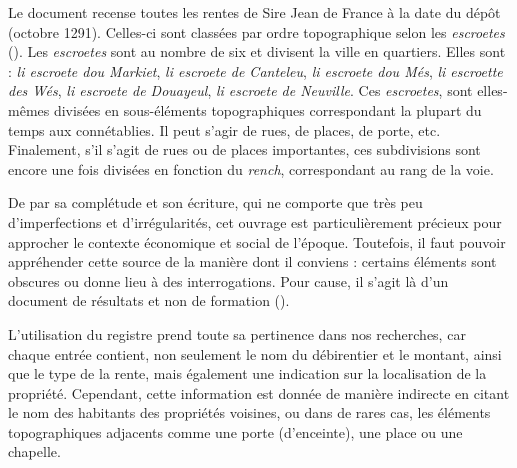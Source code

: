 Le document recense toutes les rentes de Sire Jean de France à la date du dépôt (octobre 1291). Celles-ci sont classées par ordre topographique selon les \textit{escroetes} (\cite{espinas_les_1933}). Les \textit{escroetes} sont au nombre de six et divisent la ville en quartiers. Elles sont : \textit{li escroete dou Markiet}, \textit{li escroete de Canteleu}, \textit{li escroete dou Més}, \textit{li escroette des Wés}, \textit{li escroete de Douayeul}, \textit{li escroete de Neuville}.
Ces \textit{escroetes}, sont elles-mêmes divisées en sous-éléments topographiques correspondant la plupart du temps aux connétablies. Il peut s'agir de rues, de places, de porte, etc. Finalement, s'il s'agit de rues ou de places importantes, ces subdivisions sont encore une fois divisées en fonction du \textit{rench}, correspondant au rang de la voie.

De par sa complétude et son écriture, qui ne comporte que très peu d'imperfections et d'irrégularités, cet ouvrage est particulièrement précieux pour approcher le contexte économique et social de l'époque. 
Toutefois, il faut pouvoir appréhender cette source de la manière dont il conviens : certains éléments sont obscures ou donne lieu à des interrogations. Pour cause, il s'agit là d'un document de résultats et non de formation (\cite{espinas_les_1933}).

L'utilisation du registre prend toute sa pertinence dans nos recherches, car chaque entrée contient, non seulement le nom du débirentier
et le montant, ainsi que le type de la rente, mais également une indication sur la localisation de la propriété. Cependant, cette information est donnée de manière indirecte en citant le nom des habitants des propriétés voisines, ou dans de rares cas, les éléments topographiques adjacents comme une porte (d'enceinte), une place ou une chapelle.
